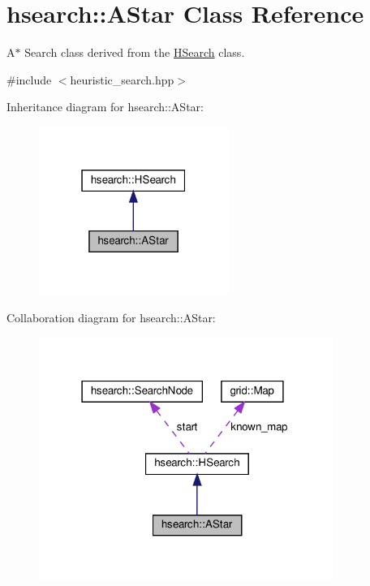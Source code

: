 \hypertarget{classhsearch_1_1AStar}{}\section{hsearch\+:\+:A\+Star Class Reference}
\label{classhsearch_1_1AStar}


A$\ast$ Search class derived from the \hyperlink{classhsearch_1_1HSearch}{H\+Search} class.  




{\ttfamily \#include $<$heuristic\+\_\+search.\+hpp$>$}



Inheritance diagram for hsearch\+:\+:A\+Star\+:
\nopagebreak
\begin{figure}[H]
\begin{center}
\leavevmode
\includegraphics[width=175pt]{db/db4/classhsearch_1_1AStar__inherit__graph}
\end{center}
\end{figure}


Collaboration diagram for hsearch\+:\+:A\+Star\+:
\nopagebreak
\begin{figure}[H]
\begin{center}
\leavevmode
\includegraphics[width=271pt]{d6/d18/classhsearch_1_1AStar__coll__graph}
\end{center}
\end{figure}
